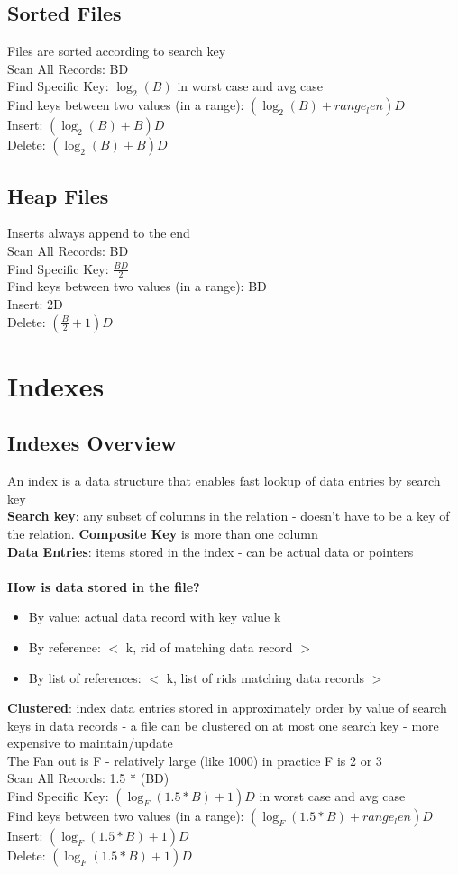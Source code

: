\documentclass{article}
\begin{document}
\subsection{Sorted Files}
Files are sorted according to search key \\
Scan All Records: BD \\
Find Specific Key: $\log_2(B)$ in worst case and avg case \\
Find keys between two values (in a range): $(\log_2(B) + range_len)D$ \\
Insert: $(\log_2(B) + B)D$\\
Delete: $(\log_2(B) + B)D$
\subsection{Heap Files}
Inserts always append to the end \\ 
Scan All Records: BD \\
Find Specific Key: $\frac{BD}{2}$ \\
Find keys between two values (in a range): BD\\
Insert: 2D \\
Delete: $(\frac{B}{2} + 1)D$
\section{Indexes}
\subsection{Indexes Overview}
An index is a data structure that enables fast lookup of data entries by search key \\ 
\textbf{Search key}: any subset of columns in the relation - doesn't have to be a key of the relation. \textbf{Composite Key} is more than one column \\
\textbf{Data Entries}: items stored in the index - can be actual data or pointers \\ \\
\textbf{How is data stored in the file?}
\begin{itemize}
\item By value: actual data record with key value k
\item By reference: $<$ k, rid of matching data record $>$
\item By list of references: $<$ k, list of rids matching data records $>$
\end{itemize}
\textbf{Clustered}: index data entries stored in approximately order by value of search keys in data records - a file can be clustered on at most one search key - more expensive to maintain/update \\
The Fan out is F - relatively large (like 1000) in practice F is 2 or 3 \\
Scan All Records: 1.5 * (BD) \\
Find Specific Key: $(\log_F(1.5 * B) + 1)D$ in worst case and avg case \\
Find keys between two values (in a range): $(\log_F(1.5 * B) + range_len)D$ \\
Insert: $(\log_F(1.5 * B) + 1)D$\\
Delete: $(\log_F(1.5 * B) + 1)D$
\end{document}

